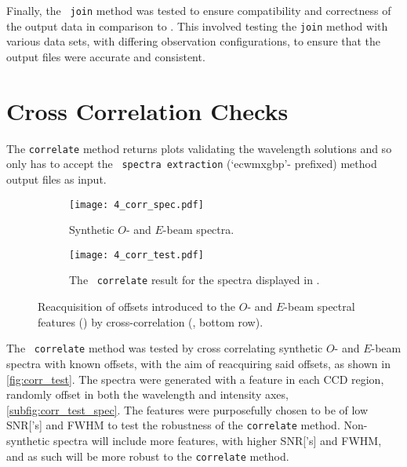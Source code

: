 Finally, the \stops\ \texttt{join} method was tested to ensure compatibility and correctness of the output data in comparison to \polsalt.
This involved testing the \texttt{join} method with various data sets, with differing observation configurations, to ensure that the output files were accurate and consistent.

\section{Cross Correlation Checks} \label{subsec:test_corr}

The \texttt{correlate} method returns plots validating the wavelength solutions and so only has to accept the \polsalt\ \texttt{spectra extraction} (`ecwmxgbp'- prefixed) method output files as input.

\begin{figure}
    \centering
    \begin{subfigure}[b]{\textwidth}
        \centering
        \texttt{[image: 4\_corr\_spec.pdf]}
        \caption{Synthetic $O$- and $E$-beam spectra.}
        \label{subfig:corr_test_spec}
    \end{subfigure}
    \hfill
    \begin{subfigure}[b]{\textwidth}
        \centering
        \texttt{[image: 4\_corr\_test.pdf]}
        \caption{The \stops\ \texttt{correlate} result for the spectra displayed in .}
        \label{subfig:corr_test_corr}
    \end{subfigure}
    \caption{Reacquisition of offsets introduced to the $O$- and $E$-beam spectral features () by cross-correlation (, bottom row).}
    \label{fig:corr_test}
\end{figure}

The \stops\ \texttt{correlate} method was tested by cross correlating synthetic $O$- and $E$-beam spectra with known offsets, with the aim of reacquiring said offsets, as shown in \autoref{fig:corr_test}.
The spectra were generated with a feature in each \gls{CCD} region, randomly offset in both the wavelength and intensity axes, \autoref{subfig:corr_test_spec}. The features were purposefully chosen to be of low \gls{SNR}['s] and \gls{FWHM} to test the robustness of the \texttt{correlate} method. Non-synthetic spectra will include more features, with higher \gls{SNR}['s] and \gls{FWHM}, and as such will be more robust to the \texttt{correlate} method.

